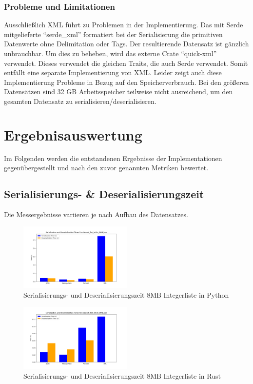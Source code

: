 \documentclass[ngerman]{seminarvorlage}
\begin{document}
\subsubsection{Probleme und Limitationen}

Ausschließlich XML führt zu Problemen in der Implementierung. Das mit Serde mitgelieferte ``serde\_xml'' formatiert bei der Serialisierung die primitiven Datenwerte ohne Delimitation oder Tags. Der resultierende Datensatz ist gänzlich unbrauchbar. Um dies zu beheben, wird das externe Crate ``quick-xml'' verwendet. Dieses verwendet die gleichen Traits, die auch Serde verwendet. Somit entfällt eine separate Implementierung von XML. Leider zeigt auch diese Implementierung Probleme in Bezug auf den Speicherverbrauch. Bei den größeren Datensätzen sind 32 GB Arbeitsspeicher teilweise nicht ausreichend, um den gesamten Datensatz zu serialisieren/deserialisieren.

\section{Ergebnisauswertung}

Im Folgenden werden die entstandenen Ergebnisse der Implementationen gegenübergestellt und nach den zuvor genannten Metriken bewertet.

\subsection{Serialisierungs- \& Deserialisierungszeit}

Die Messergebnisse variieren je nach Aufbau des Datensatzes. 

\begin{figure}[h]
  \centering
  \includegraphics[width=0.5\textwidth]{images/graphs/python_dataset_flat_intlist_8MB_json_combined_times.png}
  \caption{Serialisierungs- und Deserialisierungszeit 8MB Integerliste in Python}
  \label{fig:python_serde_8mb_intlist}
\end{figure}

\begin{figure}[h]
  \centering
  \includegraphics[width=0.5\textwidth]{images/graphs/rust_dataset_flat_intlist_8MB_json_combined_times.png}
  \caption{Serialisierungs- und Deserialisierungszeit 8MB Integerliste in Rust}
  \label{fig:rust_serde_8mb_intlist}
\end{figure}
\end{document}
